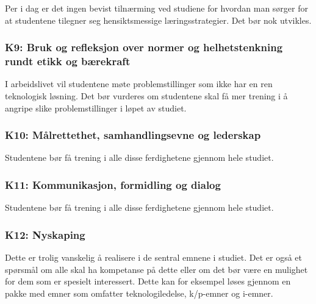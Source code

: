 Per i dag er det ingen bevist tilnærming ved studiene for hvordan man sørger for at studentene tilegner seg hensiktsmessige læringsstrategier. Det bør nok utvikles.

\subsubsection{K9: Bruk og refleksjon over normer og helhetstenkning rundt etikk og bærekraft} 
I arbeidslivet vil studentene møte problemstillinger som ikke har en ren teknologisk løsning. Det bør vurderes om studentene skal få mer trening i å angripe slike problemstillinger i løpet av studiet.

\subsubsection{K10: Målrettethet, samhandlingsevne og lederskap}

Studentene bør få trening i alle disse ferdighetene gjennom hele studiet.

\subsubsection{K11: Kommunikasjon, formidling og dialog}

Studentene bør få trening i alle disse ferdighetene gjennom hele studiet.

\subsubsection{K12: Nyskaping}

Dette er trolig vanskelig å realisere i de sentral emnene i studiet. Det er også et spørsmål om alle skal ha kompetanse på dette eller om det bør være en mulighet for dem som er spesielt interessert. Dette kan for eksempel løses gjennom en pakke med emner som omfatter teknologiledelse, k/p-emner og i-emner.